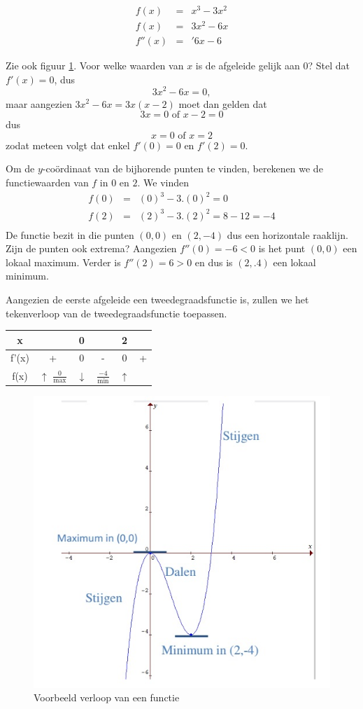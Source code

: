 \begin{voorbeeld}
	\begin{eqnarray*}
	f(x) & =& x^3-3x^2 \\
	f(x) & =& 3x^2-6x \\
	f''(x) & =& '6x-6 
	\end{eqnarray*}

	Zie ook figuur \ref{fig:verloopvb2}. Voor welke waarden van $x$ is de afgeleide gelijk aan 0? Stel dat $f'(x)=0$, dus
	\begin{equation*}
	3x^2-6x=0,
	\end{equation*}
	maar aangezien $3x^2-6x=3x(x-2)$ moet dan gelden dat
	\begin{equation*}
	3x =0 \text{ of } x-2=0
	\end{equation*}
	dus
	\begin{equation*}
	x=0 \text{ of } x=2
	\end{equation*}
	zodat meteen volgt dat enkel $f'(0)=0$ en $f'(2)=0$.
	
	Om de $y$-co\"ordinaat van de bijhorende punten te vinden, berekenen we de functiewaarden van $f$ in $0$ en $2$. We vinden
	\begin{eqnarray*}
		f(0)&=&(0)^3-3.(0)^2= 0 \\
		f(2)&=&(2)^3-3.(2)^2= 8-12=-4 \\
	\end{eqnarray*}
	De functie bezit in die punten $(0,0)$ en $(2,-4)$ dus een horizontale raaklijn. Zijn de punten ook extrema? 
	Aangezien $f''(0)=-6<0$ is het punt $(0,0)$ een lokaal maximum. Verder is $f''(2)=6>0$ en dus is $(2,.4)$ een lokaal minimum.
	
	Aangezien de eerste afgeleide een tweedegraadsfunctie is, zullen we het tekenverloop van de tweedegraadsfunctie toepassen.
	
	\begin{center}
		\begin{tabular}{c|ccccc}
			x & & 0 & & 2 & \\
			\hline 
			f'(x) & + & 0 & - & 0 & + \\
			\hline
			f(x) & $\uparrow$  $\frac{0}{\text{max}}$ & $\downarrow$ & $\frac{-4}{\text{min}}$ & $\uparrow$
		\end{tabular}
	\end{center}

	\begin{figure}[h]
		\centering
		\includegraphics[width=.5\linewidth]{6_afgeleiden_integralen/inputs/verloop_vb2}
		\caption{Voorbeeld verloop van een functie}
		\label{fig:verloopvb2}
	\end{figure}
	

\end{voorbeeld}
